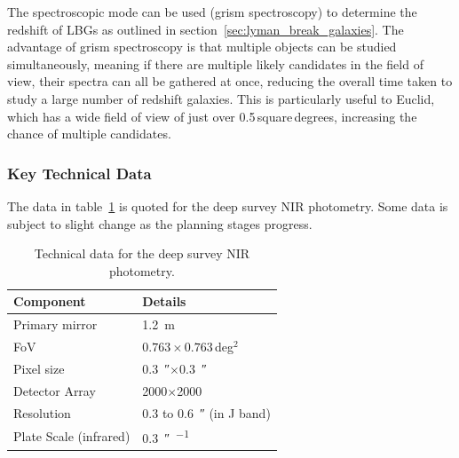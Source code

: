 		The spectroscopic mode can be used (grism spectroscopy) to determine the redshift of LBGs as outlined in section~\ref{sec:lyman_break_galaxies}. The advantage of grism spectroscopy is that multiple objects can be studied simultaneously, meaning if there are multiple likely candidates in the field of view, their spectra can all be gathered at once, reducing the overall time taken to study a large number of redshift galaxies. This is particularly useful to Euclid, which has a wide field of view of just over 0.5\,square\,degrees, increasing the chance of multiple candidates.

	\subsubsection{Key Technical Data} %
	\label{ssub:key_technical_data}
		The data in table~\ref{tab:Euclid_technical} is quoted for the deep survey NIR photometry. Some data is subject to slight change as the planning stages progress.
		\begin{table}[ht]
			\begin{center}
				\begin{tabular}{l|l}
					Component & Details \\
					\hline\hline
					Primary mirror		& \SI{1.2}{\metre} \\ \hline
					FoV 				& $0.763\times0.763$\,deg$^2$ \\ \hline
					Pixel size			& \SI{0.3}{\arcsecond}$\times$\SI{0.3}{\arcsecond} \\ \hline
					Detector Array		& \num{2000}$\times$\num{2000}\,\si{\pixel} \\ \hline
					Resolution 			& 0.3 to \SI{0.6}{\arcsecond} (in J band) \\ \hline
					Plate Scale (infrared)	& \SI{0.3}{\arcsecond\per\pixel}
				\end{tabular}
			\end{center}
			\caption{Technical data for the deep survey NIR photometry\cite{Euclid_Definition_Study_Report}.\label{tab:Euclid_technical}}
		\end{table}
